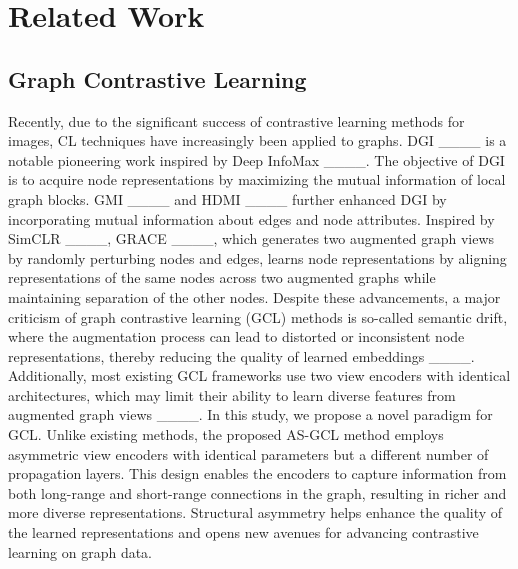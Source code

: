 \section{Related Work}
\label{Related Work}
\subsection{Graph Contrastive Learning}
Recently, due to the significant success of contrastive learning methods for images, CL techniques have increasingly been applied to graphs. DGI ____ is a notable pioneering work inspired by Deep InfoMax ____. The objective of DGI is to acquire node representations by maximizing the mutual information of local graph blocks. GMI ____ and HDMI ____ further enhanced DGI by incorporating mutual information about edges and node attributes. Inspired by SimCLR ____, GRACE ____, which generates two augmented graph views by randomly perturbing nodes and edges, learns node representations by aligning representations of the same nodes across two augmented graphs while maintaining separation of the other nodes. Despite these advancements, a major criticism of graph contrastive learning (GCL) methods is so-called semantic drift, where the augmentation process can lead to distorted or inconsistent node representations, thereby reducing the quality of learned embeddings ____. Additionally, most existing GCL frameworks use two view encoders with identical architectures, which may limit their ability to learn diverse features from augmented graph views ____. In this study, we propose a novel paradigm for GCL. Unlike existing methods, the proposed AS-GCL method employs asymmetric view encoders with identical parameters but a different number of propagation layers. This design enables the encoders to capture information from both long-range and short-range connections in the graph, resulting in richer and more diverse representations. Structural asymmetry helps enhance the quality of the learned representations and opens new avenues for advancing contrastive learning on graph data.


